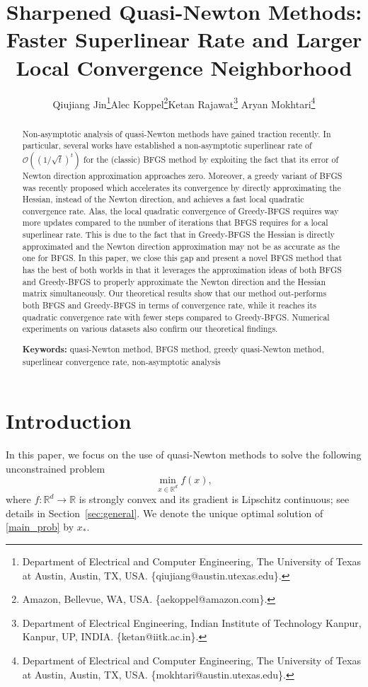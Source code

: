 \documentclass[11pt]{article}
\title{\textbf{Sharpened Quasi-Newton Methods: Faster Superlinear Rate and Larger Local Convergence Neighborhood}
\vspace{3mm}}
\author{Qiujiang Jin\thanks{Department of Electrical and Computer Engineering, The University of Texas at Austin, Austin, TX, USA. \{qiujiang@austin.utexas.edu\}.}\qquad Alec Koppel\thanks{Amazon, Bellevue, WA, USA. \{aekoppel@amazon.com\}.}\qquad Ketan Rajawat\thanks{Department of Electrical Engineering, Indian Institute of Technology Kanpur, Kanpur, UP, INDIA. \{ketan@iitk.ac.in\}.} \qquad   Aryan Mokhtari\thanks{Department of Electrical and Computer Engineering, The University of Texas at Austin, Austin, TX, USA. \{mokhtari@austin.utexas.edu\}.} \qquad    }
\date{\empty}
\numberwithin{assumption}{section}
\numberwithin{remark}{section}
\numberwithin{theorem}{section}
\begin{document}
\maketitle

\begin{abstract}
\noindent Non-asymptotic analysis of quasi-Newton methods have gained traction recently. In particular, several works have established a non-asymptotic superlinear rate of $\mathcal{O}((1/\sqrt{t})^t)$ for the (classic) BFGS method by exploiting the fact that its error of Newton direction approximation approaches zero. Moreover, a greedy variant of BFGS was recently proposed which accelerates its convergence by directly approximating the Hessian, instead of the Newton direction, and achieves a fast local quadratic convergence rate. Alas, the local quadratic convergence of Greedy-BFGS requires way more updates compared to the number of iterations that BFGS requires for a local superlinear rate. This is due to the fact that in Greedy-BFGS the Hessian is directly approximated and the Newton direction approximation may not be as accurate as the one for BFGS. In this paper, we close this gap and present a novel BFGS method that has the best of both worlds in that it leverages the approximation ideas of both BFGS and Greedy-BFGS to properly approximate the Newton direction and the Hessian matrix simultaneously. Our theoretical results show that our method out-performs both BFGS and Greedy-BFGS in terms of convergence rate, while it reaches its quadratic convergence rate with fewer steps compared to Greedy-BFGS. Numerical experiments on various datasets also confirm our theoretical findings.

\vspace{5mm}

\noindent \textbf{Keywords:} quasi-Newton method, BFGS method, greedy quasi-Newton method, superlinear convergence rate, non-asymptotic analysis
\end{abstract}

\newpage

\section{Introduction}
In this paper, we focus on the use of quasi-Newton methods to solve the following unconstrained problem
\begin{equation}\label{main_prob}
\min_{x \in \mathbb{R}^d} f(x),
\end{equation}
where $f:\mathbb{R}^d\to \mathbb{R}$ is strongly convex and its gradient is Lipschitz continuous; see details in Section~\ref{sec:general}. We denote the  unique optimal solution of \eqref{main_prob} by $x_*$.
\end{document}
